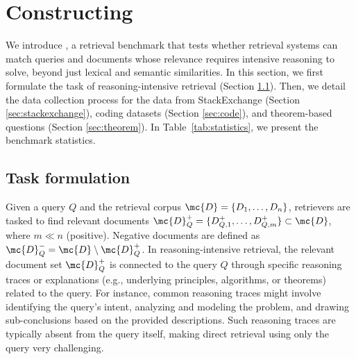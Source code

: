
\section{Constructing \ours}
\label{sec:construct}
We introduce \ours, a retrieval benchmark that tests whether retrieval systems can match queries and documents whose relevance requires intensive reasoning to solve, beyond just lexical and semantic similarities.
In this section, we first formulate the task of reasoning-intensive retrieval (Section \ref{sec:problem_formulation}). Then, we detail the data collection process for the data from StackExchange (Section \ref{sec:stackexchange}), coding datasets (Section \ref{sec:code}), and theorem-based questions (Section \ref{sec:theorem}). In Table~\ref{tab:statistics}, we present the benchmark statistics.


\subsection{Task formulation}
\label{sec:problem_formulation}
Given a query $Q$ and the retrieval corpus $\mc{D} = \{D_1, \ldots, D_n\}$, retrievers are tasked to find relevant documents $\mc{D}^+_Q = \{D_{Q,1}^+, \ldots, D_{Q,m}^+\} \subset \mc{D}$, where $m \ll n$ (positive). 
Negative documents are defined as $\mc{D}_Q^- = \mc{D} \setminus \mc{D}_Q^+$.
In reasoning-intensive retrieval, the relevant document set $\mc{D}^+_Q$ is connected to the query $Q$ through specific reasoning traces or explanations (e.g., underlying principles, algorithms, or theorems) related to the query. For instance, common reasoning traces might involve identifying the query’s intent, analyzing and modeling the problem, and drawing sub-conclusions based on the provided descriptions. Such reasoning traces are typically absent from the query itself, making direct retrieval using only the query very challenging.


